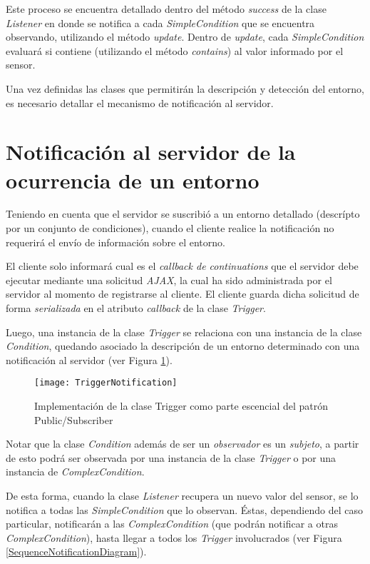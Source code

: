 Este proceso se encuentra detallado dentro del método \emph{success} de la clase \emph{Listener} en donde se notifica a cada \emph{SimpleCondition} que se encuentra observando, utilizando el método \emph{update}. Dentro de \emph{update}, cada \emph{SimpleCondition} evaluará si contiene (utilizando el método \emph{contains}) al valor informado por el sensor.

Una vez definidas las clases que permitirán la descripción y detección del entorno, es necesario detallar el mecanismo de notificación al servidor.


\section{Notificación al servidor de la ocurrencia de un entorno}

Teniendo en cuenta que el servidor se suscribió a un entorno detallado (descrípto por un conjunto de condiciones), cuando el cliente realice la notificación no requerirá el envío de información sobre el entorno.

El cliente solo informará cual es el \emph{callback de continuations} que el servidor debe ejecutar mediante una solicitud \emph{AJAX}, la cual ha sido administrada por el servidor al momento de registrarse al cliente. El cliente guarda dicha solicitud de forma \emph{serializada} en el atributo \emph{callback} de la clase \emph{Trigger}.

Luego, una instancia de la clase \emph{Trigger} se relaciona con una instancia de la clase \emph{Condition}, quedando asociado la descripción de un entorno determinado con una notificación al servidor (ver Figura \ref{TriggerNotification}).

\begin{figure}[ht!]
\centering
\texttt{[image: TriggerNotification]}
\caption{Implementación de la clase Trigger como parte escencial del patrón Public/Subscriber}
\label{TriggerNotification}
\end{figure}

Notar que la clase \emph{Condition} además de ser un \emph{observador} es un \emph{subjeto}, a partir de esto podrá ser observada por una instancia de la clase \emph{Trigger} o por una instancia de \emph{ComplexCondition}.

De esta forma, cuando la clase \emph{Listener} recupera un nuevo valor del sensor, se lo notifica a todas las \emph{SimpleCondition} que lo observan. Éstas, dependiendo del caso particular, notificarán a las \emph{ComplexCondition} (que podrán notificar a otras \emph{ComplexCondition}), hasta llegar a todos los \emph{Trigger} involucrados (ver Figura \ref{SequenceNotificationDiagram}).

